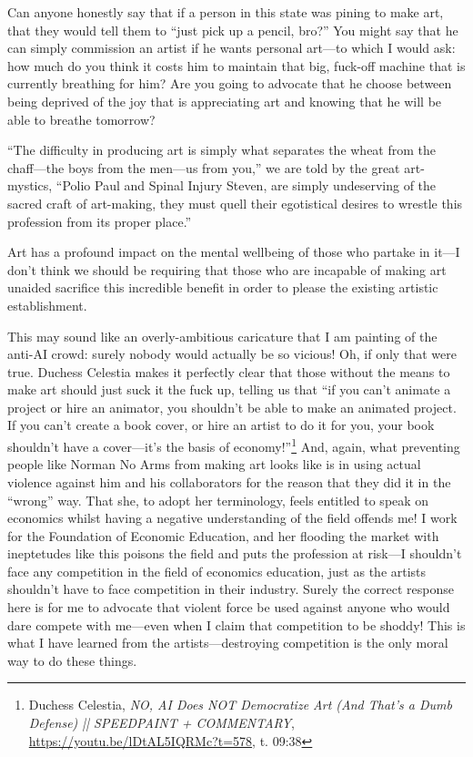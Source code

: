 \documentclass[11pt]{article}
\begin{document}
Can anyone honestly say that if a person in this state was pining to make art, that they would tell them to ``just pick up a pencil, bro?'' You might say that he can simply commission an artist if he wants personal art---to which I would ask: how much do you think it costs him to maintain that big, fuck-off machine that is currently breathing for him? Are you going to advocate that he choose between being deprived of the joy that is appreciating art and knowing that he will be able to breathe tomorrow?

``The difficulty in producing art is simply what separates the wheat from the chaff---the boys from the men---us from you,'' we are told by the great art-mystics, ``Polio Paul and Spinal Injury Steven, are simply undeserving of the sacred craft of art-making, they must quell their egotistical desires to wrestle this profession from its proper place.''

Art has a profound impact on the mental wellbeing of those who partake in it---I don't think we should be requiring that those who are incapable of making art unaided sacrifice this incredible benefit in order to please the existing artistic establishment.

This may sound like an overly-ambitious caricature that I am painting of the anti-AI crowd: surely nobody would actually be so vicious! Oh, if only that were true. Duchess Celestia makes it perfectly clear that those without the means to make art should just suck it the fuck up, telling us that ``if you can't animate a project or hire an animator, you shouldn't be able to make an animated project. If you can't create a book cover, or hire an artist to do it for you, your book shouldn't have a cover---it's the basis of economy!''\footnote{Duchess Celestia, \emph{NO, AI Does NOT Democratize Art (And That's a Dumb Defense) || SPEEDPAINT + COMMENTARY}, \url{https://youtu.be/lDtAL5IQRMc?t=578}, t. 09:38} And, again, what preventing people like Norman No Arms from making art looks like is in using actual violence against him and his collaborators for the reason that they did it in the ``wrong'' way. That she, to adopt her terminology, feels entitled to speak on economics whilst having a negative understanding of the field offends me! I work for the Foundation of Economic Education, and her flooding the market with ineptetudes like this poisons the field and puts the profession at risk---I shouldn't face any competition in the field of economics education, just as the artists shouldn't have to face competition in their industry. Surely the correct response here is for me to advocate that violent force be used against anyone who would dare compete with me---even when I claim that competition to be shoddy! This is what I have learned from the artists---destroying competition is the only moral way to do these things.
\end{document}
